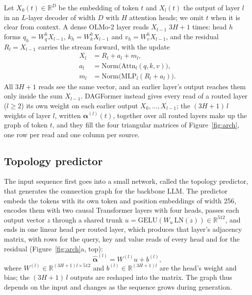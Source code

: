 \documentclass[11pt]{article}
\newcommand{\dagf}{DAGFormer}
\newcommand{\valpha}{\boldsymbol{\alpha}}
\begin{document}
Let $X_0(t)\in\mathbb{R}^D$ be the embedding of token $t$ and $X_l(t)$ the output of layer $l$ in an $L$-layer decoder of width $D$ with $H$ attention heads; we omit $t$ when it is clear from context. A dense OLMo-2 layer \citep{olmo2} reads $X_{l-1}$ $3H{+}1$ times: head $h$ forms $q_h = W_q^h X_{l-1}$, $k_h = W_k^h X_{l-1}$ and $v_h = W_v^h X_{l-1}$, and the residual $R_l = X_{l-1}$ carries the stream forward, with the update
\begin{align*}
X_l &= R_l + a_l + m_l,\\
a_l &= \mathrm{Norm}\big(\mathrm{Attn}_l(q,k,v)\big),\\
m_l &= \mathrm{Norm}\big(\mathrm{MLP}_l(R_l + a_l)\big).
\end{align*}
All $3H{+}1$ reads see the same vector, and an earlier layer's output reaches them only inside the sum $X_{l-1}$. \dagf{} instead gives every read of a routed layer ($l\ge2$) its own weight on each earlier output $X_0,\dots,X_{l-1}$; the $(3H{+}1)\,l$ weights of layer $l$, written $\valpha^{(l)}(t)$, together over all routed layers make up the graph of token $t$, and they fill the four triangular matrices of Figure~\ref{fig:arch}, one row per read and one column per source.

\subsection{Topology predictor}
\label{sec:predictor}

The input sequence first goes into a small network, called the topology predictor, that generates the connection graph for the backbone LLM. The predictor embeds the tokens with its own token and position embeddings of width 256, encodes them with two causal Transformer layers with four heads, passes each output vector $z$ through a shared trunk $u=\mathrm{GELU}(W_u\,\mathrm{LN}(z))\in\mathbb{R}^{512}$, and ends in one linear head per routed layer, which produces that layer's adjacency matrix, with rows for the query, key and value reads of every head and for the residual (Figure~\ref{fig:arch}a, top):
\begin{equation}
\hat{\valpha}^{(l)} = W^{(l)} u + b^{(l)},
\label{eq:predictor}
\end{equation}
where $W^{(l)}\in\mathbb{R}^{(3H+1)l\times 512}$ and $b^{(l)}\in\mathbb{R}^{(3H+1)l}$ are the head's weight and bias; the $(3H{+}1)\,l$ outputs are reshaped into the matrix. The graph thus depends on the input and changes as the sequence grows during generation.
\end{document}
